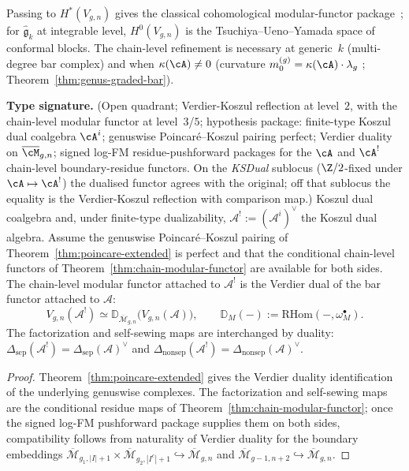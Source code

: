 \begin{remark}
\label{rem:chain-vs-classical-mf}
Passing to $H^*(V_{g,n})$ gives the classical cohomological modular-functor package~\cite{BK01}; for $\widehat{\mathfrak{g}}_k$ at integrable level, $H^0(V_{g,n})$ is the Tsuchiya--Ueno--Yamada space of conformal blocks. The chain-level refinement is necessary at generic~$k$ (multi-degree bar complex) and when $\kappa(\cA) \neq 0$ (curvature $m_0^{(g)} = \kappa(\cA) \cdot \lambda_g$ ; Theorem~\ref{thm:genus-graded-bar}).
\end{remark}

\begin{corollary}\label{cor:dual-modular-functor}
\textbf{Type signature.} (Open quadrant; Verdier-Koszul reflection at
level~$2$, with the chain-level modular functor at level~$3$/$5$;
hypothesis package: finite-type Koszul dual coalgebra $\cA^i$;
genuswise Poincar\'e--Koszul pairing perfect; Verdier duality on
$\overline{\cM}_{g,n}$; signed log-FM residue-pushforward packages for
the $\cA$ and $\cA^!$ chain-level boundary-residue functors. On the
\emph{KSDual} sublocus
\textup{(}$\Z/2$-fixed under $\cA\mapsto\cA^!$\textup{)} the dualised
functor agrees with the original; off that sublocus the equality is
the Verdier-Koszul reflection with comparison map.)
Koszul dual coalgebra and, under finite-type dualizability,
$\mathcal{A}^!:=(\mathcal{A}^i)^\vee$ the Koszul dual algebra. Assume
the genuswise Poincar\'e--Koszul pairing of
Theorem~\ref{thm:poincare-extended} is perfect and that the conditional
chain-level functors of Theorem~\ref{thm:chain-modular-functor} are
available for both sides. The chain-level modular functor attached to
$\mathcal{A}^!$ is the Verdier dual of the bar functor attached to
$\mathcal{A}$:
\begin{equation}\label{eq:dual-mf}
V_{g,n}(\mathcal{A}^!) \simeq
\mathbb D_{\overline{\mathcal{M}}_{g,n}}
\bigl(V_{g,n}(\mathcal{A})\bigr),
\qquad
\mathbb D_M(-):=\mathrm{RHom}(-,\omega_M^\bullet).
\end{equation}
The factorization and self-sewing maps are interchanged by duality:
$\Delta_{\mathrm{sep}}(\mathcal{A}^!) = \Delta_{\mathrm{sep}}
(\mathcal{A})^\vee$ and $\Delta_{\mathrm{nonsep}}(\mathcal{A}^!)
= \Delta_{\mathrm{nonsep}}(\mathcal{A})^\vee$.
\end{corollary}

\begin{proof}
Theorem~\ref{thm:poincare-extended} gives the Verdier duality
identification of the underlying genuswise complexes.  The
factorization and self-sewing maps are the conditional residue maps of
Theorem~\ref{thm:chain-modular-functor}; once the signed log-FM
pushforward package supplies them on both sides, compatibility follows
from naturality of Verdier duality for the boundary embeddings
$\overline{\mathcal{M}}_{g_1,|I|+1}\times
\overline{\mathcal{M}}_{g_2,|I^c|+1}\hookrightarrow
\overline{\mathcal{M}}_{g,n}$ and
$\overline{\mathcal{M}}_{g-1,n+2}\hookrightarrow
\overline{\mathcal{M}}_{g,n}$.
\end{proof}

